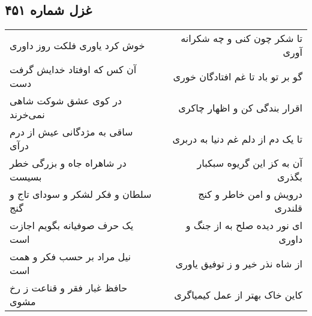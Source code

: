 \begin{center}
\section*{غزل شماره ۴۵۱}
\label{sec:sh451}
\begin{longtable}{l p{0.5cm} r}
خوش کرد یاوری فلکت روز داوری
&&
تا شکر چون کنی و چه شکرانه آوری
\\
آن کس که اوفتاد خدایش گرفت دست
&&
گو بر تو باد تا غم افتادگان خوری
\\
در کوی عشق شوکت شاهی نمی‌خرند
&&
اقرار بندگی کن و اظهار چاکری
\\
ساقی به مژدگانی عیش از درم درآی
&&
تا یک دم از دلم غم دنیا به دربری
\\
در شاهراه جاه و بزرگی خطر بسیست
&&
آن به کز این گریوه سبکبار بگذری
\\
سلطان و فکر لشکر و سودای تاج و گنج
&&
درویش و امن خاطر و کنج قلندری
\\
یک حرف صوفیانه بگویم اجازت است
&&
ای نور دیده صلح به از جنگ و داوری
\\
نیل مراد بر حسب فکر و همت است
&&
از شاه نذر خیر و ز توفیق یاوری
\\
حافظ غبار فقر و قناعت ز رخ مشوی
&&
کاین خاک بهتر از عمل کیمیاگری
\\
\end{longtable}
\end{center}
